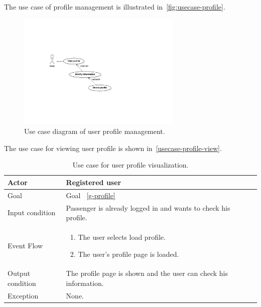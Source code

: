 The use case of profile management is illustrated in~\autoref{fig:usecase-profile}.
\begin{figure}
\begin{center}
\includegraphics[width=0.7\textwidth]{diagrams/usecase_profile.pdf}
\caption{Use case diagram of user profile management.}
\label{fig:usecase-profile}
\end{center}
\end{figure}

The use case for viewing user profile is shown in~\autoref{usecase-profile-view}.

\begin{table}
\begin{center}
\begin{tabular}{| l | p{} |}
\hline
Actor & Registered user \\
\hline
Goal & Goal ~\ref{g-profile}
\\
\hline
Input condition & Passenger is already logged in and wants to check his profile.  \\
\hline
Event Flow & \begin{enumerate}
	\item The user selects load profile.
	\item The user's profile page is loaded.
	\end{enumerate}
\\
\hline
Output condition & The profile page is shown and the user can check his information. \\
\hline

Exception & None. \\
\hline
\end{tabular}
\end{center}
\caption{Use case for user profile visualization.}
\label{usecase-profile-view}
\end{table}



